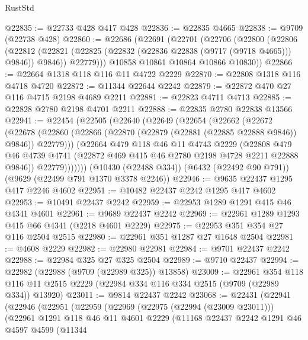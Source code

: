\begin{lexlean}{RustStd}
\begin{coremodule}
@22835 := @22733 @428 @417 @428
@22836 := @22835 @4665
@22838 := @9709 (@22738 @428)
@22860 := @22686
    (@22691
      (@22701
        (@22706
          (@22800
            (@22806
              (@22812 (@22821 (@22825 (@22832 (@22836 @22838 (@9717 (@9718 @4665))) @9846)) @9846))
              @22779)))
        @10858
        @10861
        @10864
        @10866
        @10830))
@22866 := @22664 @1318 @118 @116 @11 @4722 @2229
@22870 := @22808 @1318 @116 @4718 @4720
@22872 := @11344 @22644 @2242
@22879 := @22872 @470 @27 @116 @4715 @2198 @4689 @2211
@22881 := @22823 @4711 @4713
@22885 := @22828 @2780 @2198 @4701 @2211
@22888 := @22835 @2780 @22838 @13566
@22941 := @22454
    (@22505
      (@22640
        (@22649
          (@22654
            (@22662
              (@22672
                (@22678
                  (@22860 (@22866 (@22870 (@22879 (@22881 (@22885 @22888 @9846)) @9846)) @22779)))
                (@22664
                  @479
                  @118
                  @46
                  @11
                  @4743
                  @2229
                  (@22808
                    @479
                    @46
                    @4739
                    @4741
                    (@22872 @469 @415 @46 @2780 @2198 @4728 @2211 @22888 @9846))
                  @22779)))))))
    (@10430 (@22488 @334))
    (@6432 (@22492 @90 @791))
    (@9629 (@22499 @791 @1370 @3378 @2246))
@22946 := @9635 @22437 @1295 @417 @2246 @4602
@22951 := @10482 @22437 @2242 @1295 @417 @4602
@22953 := @10491 @22437 @2242
@22959 := @22953 @1289 @1291 @415 @46 @4341 @4601
@22961 := @9689 @22437 @2242
@22969 := @22961 @1289 @1293 @415 @66 @4341 (@2218 @4601 @2229)
@22975 := @22953 @351 @354 @27 @116 @2504 @2515
@22980 := @22961 @351 @1287 @27 @1648 @2504
@22981 := @4608 @2229
@22982 := @22980 @22981
@22984 := @9701 @22437 @2242
@22988 := @22984 @325 @27 @325 @2504
@22989 := @9710 @22437
@22994 := @22982 (@22988 (@9709 (@22989 @325)) @13858)
@23009 := @22961
    @354
    @118
    @116
    @11
    @2515
    @2229
    (@22984 @334 @116 @334 @2515 (@9709 (@22989 @334)) @13920)
@23011 := @9814 @22437 @2242
@23068 := @22431
    (@22941
      (@22946
        (@22951
          (@22959
            (@22969
              (@22975 (@22994 (@23009 @23011)))
              (@22961
                @1291
                @118
                @46
                @11
                @4601
                @2229
                (@11168
                  @22437
                  @2242
                  @1291
                  @46
                  @4597
                  @4599
                  (@11344

\end{coremodule}
\end{lexlean}
